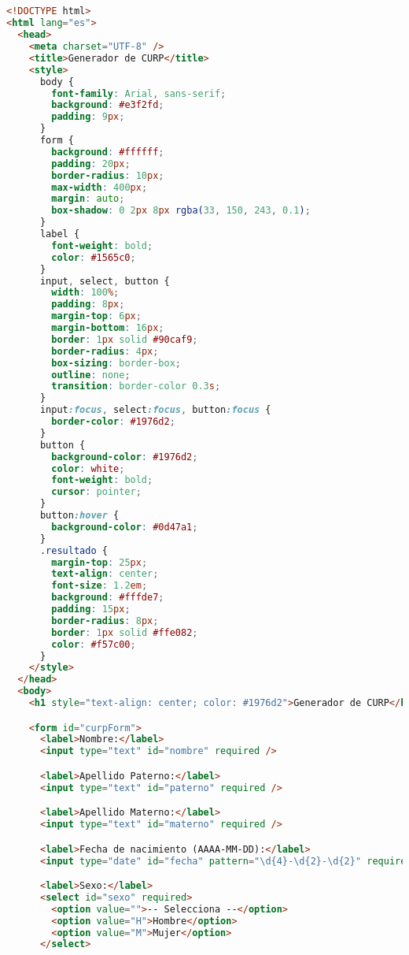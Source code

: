 \documentclass[10pt,a4paper]{article}
\begin{document}
\subsection{\color{colorESCOM}{Código HTML}}
\begin{lstlisting}[language=HTML]
<!DOCTYPE html>
<html lang="es">
  <head>
    <meta charset="UTF-8" />
    <title>Generador de CURP</title>
    <style>
      body {
        font-family: Arial, sans-serif;
        background: #e3f2fd;
        padding: 9px;
      }
      form {
        background: #ffffff;
        padding: 20px;
        border-radius: 10px;
        max-width: 400px;
        margin: auto;
        box-shadow: 0 2px 8px rgba(33, 150, 243, 0.1);
      }
      label {
        font-weight: bold;
        color: #1565c0;
      }
      input, select, button {
        width: 100%;
        padding: 8px;
        margin-top: 6px;
        margin-bottom: 16px;
        border: 1px solid #90caf9;
        border-radius: 4px;
        box-sizing: border-box;
        outline: none;
        transition: border-color 0.3s;
      }
      input:focus, select:focus, button:focus {
        border-color: #1976d2;
      }
      button {
        background-color: #1976d2;
        color: white;
        font-weight: bold;
        cursor: pointer;
      }
      button:hover {
        background-color: #0d47a1;
      }
      .resultado {
        margin-top: 25px;
        text-align: center;
        font-size: 1.2em;
        background: #fffde7;
        padding: 15px;
        border-radius: 8px;
        border: 1px solid #ffe082;
        color: #f57c00;
      }
    </style>
  </head>
  <body>
    <h1 style="text-align: center; color: #1976d2">Generador de CURP</h1>

    <form id="curpForm">
      <label>Nombre:</label>
      <input type="text" id="nombre" required />

      <label>Apellido Paterno:</label>
      <input type="text" id="paterno" required />

      <label>Apellido Materno:</label>
      <input type="text" id="materno" required />

      <label>Fecha de nacimiento (AAAA-MM-DD):</label>
      <input type="date" id="fecha" pattern="\d{4}-\d{2}-\d{2}" required />

      <label>Sexo:</label>
      <select id="sexo" required>
        <option value="">-- Selecciona --</option>
        <option value="H">Hombre</option>
        <option value="M">Mujer</option>
      </select>


\end{lstlisting}
\end{document}
